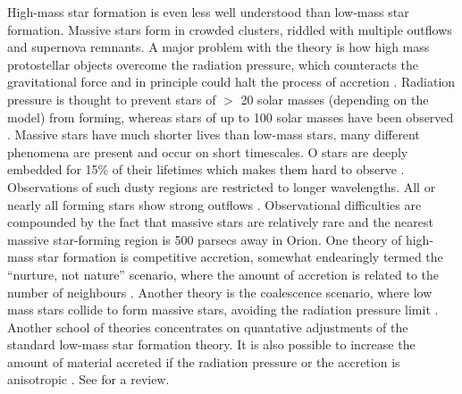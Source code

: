 {
High-mass star formation is even less well understood than low-mass star formation.
Massive stars form in crowded clusters, riddled with multiple outflows and supernova remnants.
A major problem with the theory is how high mass protostellar objects overcome the radiation pressure, which counteracts the gravitational force and in principle could halt the process of accretion \citep{1974A&A....37..149K, 1977A&A....54..183Y, 1987ApJ...319..850W}.
Radiation pressure is thought to prevent stars of $>$ 20 solar masses (depending on the model) from forming, whereas
stars of up to 100 solar masses have been observed \citep{2004ApJ...610L.109F}.
Massive stars have much shorter lives than low-mass stars, many different phenomena are present and occur on short timescales.
O stars are deeply embedded for 15\% of their lifetimes which makes them hard to observe \citep{1989ApJ...340..265W}.
Observations of such dusty regions are restricted to longer wavelengths.
All or nearly all forming stars show strong outflows \citep{1989ApJ...340..472T}.
Observational difficulties are compounded by the fact that massive stars are relatively rare and the nearest massive star-forming region is 500 parsecs away in Orion.
One theory of high-mass star formation is competitive accretion, somewhat endearingly termed the ``nurture, not nature'' scenario, where the amount of accretion is related to the number of neighbours \citep{2004MNRAS.349..735B}.
Another theory is the coalescence scenario, where low mass stars collide to form massive stars, avoiding the radiation pressure limit \citep{1998MNRAS.298...93B}.
Another school of theories concentrates on quantative adjustments of the standard low-mass star formation theory.
It is also possible to increase the amount of material accreted if the radiation pressure or the accretion is anisotropic \citep{2006ApJ...637..798C}.
See \citet{Beutheretal2006} for a review.
}

